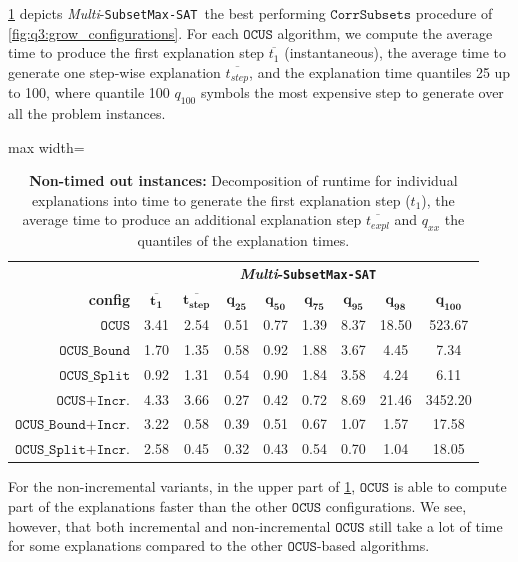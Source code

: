 \documentclass[twoside,11pt]{article}
\newcommand\mm[1]{\ensuremath{#1}\xspace}
\newcommand\call[1]{\mm{\texttt{#1}}}
\newcommand\subsetmaxsat{\texttt{SubsetMax-SAT}}
\newcommand\comus{\mm{\call{OCUS}}}
\newcommand{\comusbound}{\mm{\call{OCUS\_Bound}}}
\newcommand\comusincr{\mm{\call{OCUS+Incr.}}}
\newcommand\ousbiter{\mm{\call{OCUS\_Split}}}
\newcommand\ousbincr{\mm{\call{OCUS\_Bound+Incr.}}}
\newcommand\ousbiterincr{\mm{\call{OCUS\_Split+Incr.}}}
\newcommand\corrsubsets{\mm{\call{CorrSubsets}}}
\begin{document}
\cref{tab:indiv-explanations-all} depicts \emph{Multi}-\subsetmaxsat~the best performing \corrsubsets procedure of \cref{fig:q3:grow_configurations}. For each \comus algorithm, we compute the average time to produce the first explanation step $\overline{t_{1}}$ (instantaneous), the average time to generate one step-wise explanation $\overline{t_{step}}$, and the explanation time quantiles 25 up to 100, where quantile 100 $q_{100}$ symbols the most expensive step to generate over all the problem instances.

\begin{table}[!h]
	\centering
	\begin{adjustbox}{max width=\textwidth}
		\begin{tabular}{r|c|c|cccccc}
			& \multicolumn{8}{c}{\textbf{\emph{Multi}-\subsetmaxsat}}\\[1ex]
			\textbf{config}          & $\mathbf{\overline{t_{1}}}$  & $\mathbf{\overline{t_{step}}}$ &  $\mathbf{q_{25}}$ &  $\mathbf{q_{50}}$ &  $\mathbf{q_{75}}$  & $\mathbf{q_{95}}$ &  $\mathbf{q_{98}}$ & $\mathbf{q_{100}}$ \\ \midrule
			\comus          &              3.41 &        2.54 &  0.51 &  0.77 &  1.39 &  8.37 & 18.50 &  523.67 \\
			\comusbound     &              1.70 &        1.35 &  0.58 &  0.92 &  1.88 &  3.67 &  4.45 &    7.34 \\
			\ousbiter       &              0.92 &        1.31 &  0.54 &  0.90 &  1.84 &  3.58 &  4.24 &    6.11 \\ \hline
			\comusincr     &              4.33 &        3.66 &  0.27 &  0.42 &  0.72 &  8.69 & 21.46 & 3452.20 \\
			\ousbincr       &              3.22 &        0.58 &  0.39 &  0.51 &  0.67 &  1.07 &  1.57 &   17.58 \\
			\ousbiterincr   &              2.58 &        0.45 &  0.32 &  0.43 &  0.54 &  0.70 &  1.04 &   18.05 \\
		\end{tabular}
	\end{adjustbox}
	\caption{\textbf{Non-timed out instances:} Decomposition of runtime for individual explanations into time to generate the first explanation step ($t_1$), the average time to produce an additional explanation step $\overline{t_{expl}}$ and $q_{xx}$ the quantiles of the explanation times.}
	\label{tab:indiv-explanations-all}
\end{table}

For the non-incremental variants, in the upper part of \cref{tab:indiv-explanations-all}, \comus is able to compute part of the explanations faster than the other \comus configurations. We see, however, that both incremental and non-incremental \comus still take a lot of time for some explanations compared to the other \comus-based algorithms.
\end{document}
